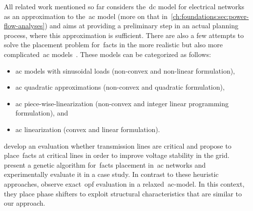 All related work mentioned so far considers the~\gls{dc} model for electrical
networks as an approximation to the~\gls{ac} model (more on that
in~\cref{ch:foundations:sec:power-flow-analyses}) and aims at providing a
preliminary step in an actual planning process, where this approximation is
sufficient.  There are also a few attempts to solve the placement problem
for~\gls{facts} in the more realistic but also more complicated~\gls{ac}
models~\parencite{744495}. These models can be categorized as follows:
%
\begin{itemize}
    \item \gls{ac} models with sinusoidal loads (non-convex and non-linear
        formulation), 
    \label{ch:related-work:AC:1}
    \item \gls{ac} quadratic approximations (non-convex and quadratic
        formulation), 
    \label{ch:related-work:AC:2}
    \item \gls{ac} piece-wise-linearization (non-convex and integer linear
        programming formulation), and
    \label{ch:related-work:AC:3}
    \item \gls{ac} linearization (convex and linear formulation). 
    \label{ch:related-work:AC:4}
\end{itemize}
% 
\textcite{Sha03} develop an evaluation whether transmission lines are critical
and propose to place~\gls{facts} at critical lines in order to improve
voltage stability in the grid. \textcite{is-sonl-04} present a genetic algorithm
for~\gls{facts} placement in~\gls{ac} networks and experimentally
evaluate it in a case study. In contrast to these heuristic approaches,
\textcite{6507352} observe exact~\gls{opf} evaluation in a
relaxed~\gls{ac}-model. In this context, they place phase shifters to
exploit structural characteristics that are similar to our approach.
% 
